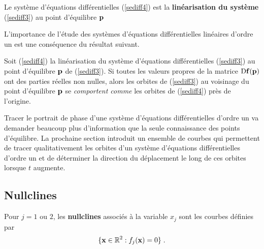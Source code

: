 {\begin{defn}
Le système d'équations différentielles (\ref{sediff4}) est la
{\bfseries linéarisation du système} (\ref{sediff3}) au point d'équilibre
$\mathbf{p}$
\end{defn}

L'importance de l'étude des systèmes d'équations différentielles linéaires
d'ordre un est une conséquence du résultat suivant.

\begin{prop} \label{HartGrob}
Soit (\ref{sediff4}) la linéarisation du système d'équations
différentielles (\ref{sediff3}) au point d'équilibre $\mathbf{p}$ de
(\ref{sediff3}).  Si toutes les valeurs propres de la matrice
$\mathrm{D} \mathbf{f}(\mathbf{p})$ ont des parties réelles non nulles, alors les
orbites de (\ref{sediff3}) au voisinage du point d'équilibre
$\mathbf{p}$ se {\em comportent comme} les orbites de (\ref{sediff4})
près de l'origine.
\end{prop}

Tracer le portrait de phase d'une système d'équations différentielles
d'ordre un va demander beaucoup plus d'information que la seule
connaissance des points d'équilibre.  La prochaine section introduit un
ensemble de courbes qui permettent de tracer qualitativement les
orbites d'un système d'équations différentielles d'ordre
un et de déterminer la direction du déplacement le long de ces
orbites lorsque $t$ augmente.

\subsection{Nullclines}

\begin{defn} 
Pour $j=1$ ou $2$, les {\bfseries nullclines} associés à la variable $x_j$
sont les courbes définies par
\[
\{ \mathbf{x}\in \mathbb{R}^2 : f_j(\mathbf{x})=0 \} \; .
\]
\end{defn}

}
